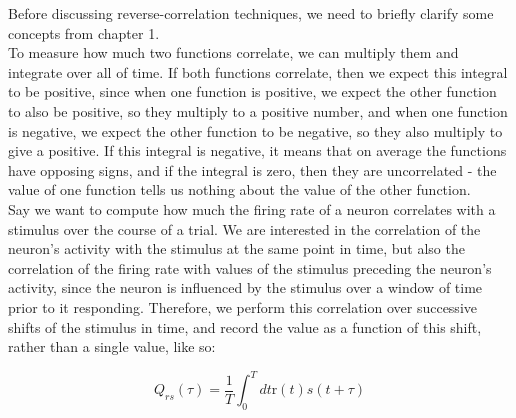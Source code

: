\documentclass{article}
\begin{document}
Before discussing reverse-correlation techniques, we need to briefly clarify some concepts from chapter 1.\\

To measure how much two functions correlate, we can multiply them and integrate over all of time. If both functions correlate, then we expect this integral to be positive, since when one function is positive, we expect the other function to also be positive, so they multiply to a positive number, and when one function is negative, we expect the other function to be negative, so they also multiply to give a positive. If this integral is negative, it means that on average the functions have opposing signs, and if the integral is zero, then they are uncorrelated - the value of one function tells us nothing about the value of the other function.\\

Say we want to compute how much the firing rate of a neuron correlates with a stimulus over the course of a trial. We are interested in the correlation of the neuron's activity with the stimulus at the same point in time, but also the correlation of the firing rate with values of the stimulus preceding the neuron's activity, since the neuron is influenced by the stimulus over a window of time prior to it responding. Therefore, we perform this correlation over successive shifts of the stimulus in time, and record the value as a function of this shift, rather than a single value, like so:

\begin{equation*}
	Q_{rs}(\tau) = \frac{1}{T} \int_0^Tdt \text{r}(t)s(t+\tau)
\end{equation*}
\end{document}
